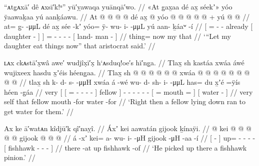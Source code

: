 
\ex\label{ex:89-91-let-her-eat}%
%
\begingl
	\glpreamble	“ᴀtg̣ᴀxā′ dê ᴀxsī′k!ᵘ” yū′ỵawaqa yuānqā′wo. //
	\glpreamble	«\!At g̱ax̱aa dé ax̱ séekʼ\!» yóo ÿaawaḵaa yú aanḵáawu. //
	\gla	{} At @  @ {} @ {} @ {}
			dé {} ax̱  @ {} {} {}
		yóo @  @ {} @ {} @ {} @ {} +
		{} yú  @ {} @ {} {} //
	\glb	{} at= {} g̱-  -μμL
			dé {} ax̱ sée -kʼ {} {}
		yóo= ÿ- wu- i-  -μμL
		{} yú aan- ḵáaʷ -í {} //
	\glc	{}[ = \· -  -
			already {}[  daughter - {}] {}]
		= - - -  -
		{}[  land- man - {}] //
	\gld	{} thing=  {} {} {}
			now {} my  {} {} {}
		  {} {} {} {}
		{} that  {} {} {} //
	\glft	‘“Let my daughter eat things now” that aristocrat said.’
		//
\endgl
\xe

\ex\label{ex:89-92-ran-for-water}%
%
\begingl
	\glpreamble	ʟᴀx ckᴀstā′x̣wâ awe′ wudjîx̣ī′x̣ h`ᴀsduq!oe′s hī′ng̣a. //
	\glpreamble	Tlax̱ sh kastáa xwáa áwé wujixeex hasdu x̱ʼéis héeng̱aa. //
	\gla	Tlax̱ {} {} sh @  @ {} @ {} @ {} @ {} @ {} {} xwáa {}  @ {}
		 @ {} @ {} @ {} @ {} @ {}
		{}  @ {}  @ {} {}
		{}  @ {} {} //
	\glb	tlax̱ {} {} sh k- d- s-  -μμH {} {} xwáa {} á -wé
		wu- d- sh- i-  -μμL
		{} has= du x̱ʼé =ÿís {}
		{} héen -g̱áa {} //
	\glc	very {}[ {}[ = - - -
			 - \· {}] fellow {}] - 
		- - - -  -
		{}[ =  mouth = {}]
		{}[ water - {}] //
	\gld	very {} {} self\•  {} {} {} {} \·that {} fellow {}  {}
		 {} {} {} {} {}
		{}  {} mouth -for {}
		{} water -for {} //
	\glft	‘Right then a fellow lying down ran to get water for them.’
		//
\endgl
\xe

\ex\label{ex:89-93-put-up-fishhawk-quill}%
%
\begingl
	\glpreamble	Ax ke ā′watᴀn kîdjū′k qî′naỵî. //
	\glpreamble	Áxʼ kei aawatán gijook ḵínaÿi. //
	\gla	{}  @ {} {} kei @  @ {} @ {} @ {} @ {}
		{} gijook  @ {} @ {} @ {} {} //
	\glb	{} á -xʼ {} kei= a- wu- i-  -μH
		{} gijook  -μH -aa -í {} //
	\glc	{}[  - {}] up= - - -  -
		{}[ fishhawk  - - - {}] //
	\gld	{} there -at {} up  {} {} {} {}
		{} fishhawk  {} {} -of {} //
	\glft	‘He picked up there a fishhawk pinion.’
		//
\endgl
\xe

